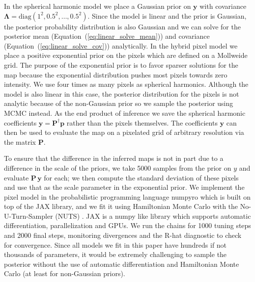 \documentclass[linenumbers,modern]{aastex62}
\begin{document}
In the spherical harmonic model we place a Gaussian prior on $\mathbf{y}$ with covariance $\boldsymbol{\Lambda}=\mathrm{diag}(1^2,0.5^2,\dots,0.5^2)$.
Since the model is linear and the prior is Gaussian, the posterior probability distribution is also Gaussian and we can solve for the posterior mean (Equation~(\ref{eq:linear_solve_mean})) and covariance (Equation~(\ref{eq:linear_solve_cov})) analytically.
In the hybrid pixel model we place a positive exponential prior on the pixels which are defined on a Mollweide grid. 
The purpose of the exponential prior is to favor sparser solutions for the map because the exponential distribution pushes most pixels towards zero intensity.
We use four times as many pixels as spherical harmonics.
Although the model is also linear in this case, the posterior distribution for the pixels is not analytic because of the non-Gaussian prior so we sample the posterior using MCMC instead.
As the end product of inference we save the spherical harmonic coefficients $\mathbf{y}=\mathbf{P}^\dagger\mathbf{p}$ rather than the pixels themselves.
The coefficients $\mathbf{y}$ can then be used to evaluate the map on a pixelated grid of arbitrary resolution via the matrix $\mathbf{P}$. 

To ensure that the difference in the inferred maps is not in part due to a difference in the scale of the priors, we take 5000 samples from the prior on $y$ and evaluate $\mathbf{P}\,\mathbf{y}$ for each; we then compute the standard deviation of these pixels and use that as the scale parameter in the exponential prior.
We implement the pixel model in the probabilistic programming language \textsf{numpyro} \citep{phan2019a} which is built on top of the \textsf{JAX} \citep{jax2018github} library, and we fit it using Hamiltonian Monte Carlo with the No-U-Turn-Sampler (NUTS) \citep{hoffman2014}.
\textsf{JAX} is a \textsf{numpy} like library which supports automatic differentiation, parallelization and GPUs.
We run the chains for 1000 tuning steps and 2000 final steps, monitoring divergences \citep{betancourt2013} and the R-hat  diagnostic  \citep{gelman1992a} to check for convergence.
Since all models we fit in this paper have hundreds if not thousands of parameters, it would be extremely challenging to sample the posterior  without the use of automatic differentiation and Hamiltonian Monte Carlo (at least for non-Gaussian priors).
\end{document}
